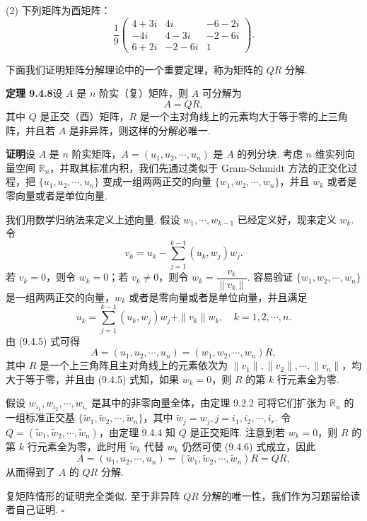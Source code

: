 \documentclass[UTF8, 12pt, fontset=fandol, oneside]{ctexart}
\begin{document}
(2) 下列矩阵为酉矩阵：
\[
  \frac19
  \left(\begin{array}{ccc}
    4+3i & 4i & -6-2i\\
    -4i & 4-3i & -2-6i\\
    6+2i & -2-6i & 1
  \end{array}\right).
\]

下面我们证明矩阵分解理论中的一个重要定理，称为矩阵的 $QR$ 分解.

\noindent\textbf{定理 9.4.8}\quad 设 $A$ 是 $n$ 阶实（复）矩阵，则 $A$ 可分解为
\[
  A=QR,
\]
其中 $Q$ 是正交（酉）矩阵，$R$ 是一个主对角线上的元素均大于等于零的上三角阵，并且若 $A$ 是非异阵，则这样的分解必唯一.

\noindent\textbf{证明}\quad 设 $A$ 是 $n$ 阶实矩阵，$A=(u_1,u_2,\cdots,u_n)$ 是 $A$ 的列分块. 考虑 $n$ 维实列向量空间 $\mathbb R_n$，并取其标准内积，我们先通过类似于 Gram-Schmidt 方法的正交化过程，把 $\{u_1,u_2,\cdots,u_n\}$ 变成一组两两正交的向量 $\{w_1,w_2,\cdots,w_n\}$，并且 $w_k$ 或者是零向量或者是单位向量.

我们用数学归纳法来定义上述向量. 假设 $w_1,\cdots,w_{k-1}$ 已经定义好，现来定义 $w_k$. 令
\[
  v_k=u_k-\sum_{j=1}^{k-1}(u_k,w_j)w_j.
\]
若 $v_k=0$，则令 $w_k=0$；若 $v_k\ne0$，则令 $w_k=\dfrac{v_k}{\|v_k\|}$. 容易验证 $\{w_1,w_2,\cdots,w_n\}$ 是一组两两正交的向量，$w_k$ 或者是零向量或者是单位向量，并且满足
\begin{equation}
  u_k=\sum_{j=1}^{k-1}(u_k,w_j)w_j+\|v_k\|w_k,\quad k=1,2,\cdots,n.
  \tag{9.4.5}
\end{equation}
由 (9.4.5) 式可得
\begin{equation}
  A=(u_1,u_2,\cdots,u_n)=(w_1,w_2,\cdots,w_n)R,
  \tag{9.4.6}
\end{equation}
其中 $R$ 是一个上三角阵且主对角线上的元素依次为 $\|v_1\|,\|v_2\|,\cdots,\|v_n\|$，均大于等于零，并且由 (9.4.5) 式知，如果 $w_k=0$，则 $R$ 的第 $k$ 行元素全为零.

假设 $w_{i_1},w_{i_2},\cdots,w_{i_r}$ 是其中的非零向量全体，由定理 9.2.2 可将它们扩张为 $\mathbb R_n$ 的一组标准正交基 $\{\widetilde w_1,\widetilde w_2,\cdots,\widetilde w_n\}$，其中 $\widetilde w_j=w_j,j=i_1,i_2,\cdots,i_r$. 令 $Q=(\widetilde w_1,\widetilde w_2,\cdots,\widetilde w_n)$，由定理 9.4.4 知 $Q$ 是正交矩阵. 注意到若 $w_k=0$，则 $R$ 的第 $k$ 行元素全为零，此时用 $\widetilde w_k$ 代替 $w_k$ 仍然可使 (9.4.6) 式成立，因此
\[
  A=(u_1,u_2,\cdots,u_n)=(\widetilde w_1,\widetilde w_2,\cdots,\widetilde w_n)R=QR,
\]
从而得到了 $A$ 的 $QR$ 分解.

复矩阵情形的证明完全类似. 至于非异阵 $QR$ 分解的唯一性，我们作为习题留给读者自己证明. $\square$
\end{document}
